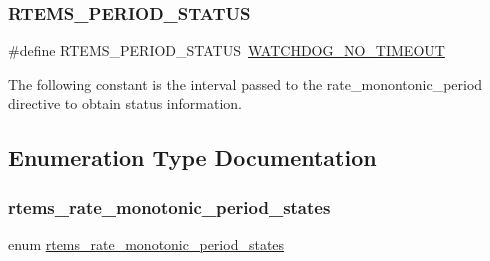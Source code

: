 \subsubsection{\texorpdfstring{RTEMS\_PERIOD\_STATUS}{RTEMS\_PERIOD\_STATUS}}
{\footnotesize\ttfamily \#define R\+T\+E\+M\+S\+\_\+\+P\+E\+R\+I\+O\+D\+\_\+\+S\+T\+A\+T\+US~\mbox{\hyperlink{group__RTEMSScoreWatchdog_gaa7a11d3dcb3ba512032421888d16b327}{W\+A\+T\+C\+H\+D\+O\+G\+\_\+\+N\+O\+\_\+\+T\+I\+M\+E\+O\+UT}}}

The following constant is the interval passed to the rate\+\_\+monontonic\+\_\+period directive to obtain status information. 

\subsection{Enumeration Type Documentation}
\mbox{\label{group__ClassicRateMon_ga0fd6fa9e7304b022e004061d542ca743}} 
\subsubsection{\texorpdfstring{rtems\_rate\_monotonic\_period\_states}{rtems\_rate\_monotonic\_period\_states}}
{\footnotesize\ttfamily enum \mbox{\hyperlink{group__ClassicRateMon_ga0fd6fa9e7304b022e004061d542ca743}{rtems\+\_\+rate\+\_\+monotonic\+\_\+period\+\_\+states}}}

